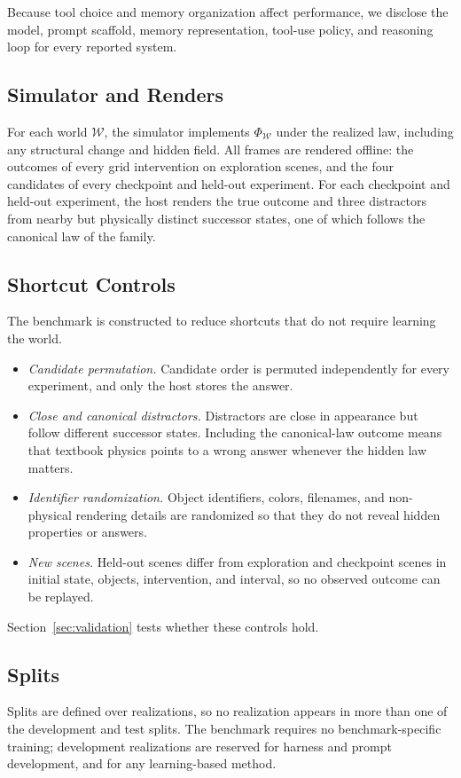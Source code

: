 
Because tool choice and memory organization affect performance, we disclose the model, prompt scaffold, memory representation, tool-use policy, and reasoning loop for every reported system.

\subsection{Simulator and Renders}

For each world $\mathcal{W}$, the simulator implements $\Phi_{\mathcal{W}}$ under the realized law, including any structural change and hidden field. All frames are rendered offline: the outcomes of every grid intervention on exploration scenes, and the four candidates of every checkpoint and held-out experiment. For each checkpoint and held-out experiment, the host renders the true outcome and three distractors from nearby but physically distinct successor states, one of which follows the canonical law of the family. 

\subsection{Shortcut Controls}
\label{sec:construction:antishortcut}

The benchmark is constructed to reduce shortcuts that do not require learning the world.
\begin{itemize}
  \item \emph{Candidate permutation.} Candidate order is permuted independently for every experiment, and only the host stores the answer.
  \item \emph{Close and canonical distractors.} Distractors are close in appearance but follow different successor states. Including the canonical-law outcome means that textbook physics points to a wrong answer whenever the hidden law matters.
  \item \emph{Identifier randomization.} Object identifiers, colors, filenames, and non-physical rendering details are randomized so that they do not reveal hidden properties or answers.
  \item \emph{New scenes.} Held-out scenes differ from exploration and checkpoint scenes in initial state, objects, intervention, and interval, so no observed outcome can be replayed.
\end{itemize}
Section~\ref{sec:validation} tests whether these controls hold.

\subsection{Splits}

Splits are defined over realizations, so no realization appears in more than one of the development and test splits. The benchmark requires no benchmark-specific training; development realizations are reserved for harness and prompt development, and for any learning-based method. 
